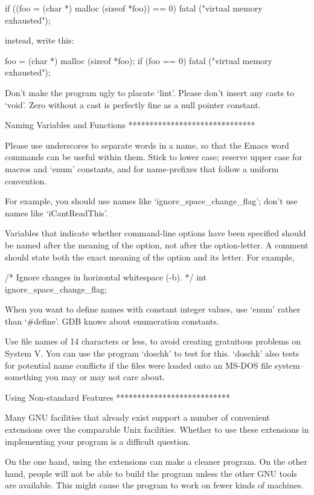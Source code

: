      if ((foo = (char *) malloc (sizeof *foo)) == 0)
       fatal ("virtual memory exhausted");

instead, write this:

     foo = (char *) malloc (sizeof *foo);
     if (foo == 0)
       fatal ("virtual memory exhausted");

   Don't make the program ugly to placate `lint'.  Please don't insert
any casts to `void'.  Zero without a cast is perfectly fine as a null
pointer constant.

Naming Variables and Functions
******************************

   Please use underscores to separate words in a name, so that the Emacs
word commands can be useful within them.  Stick to lower case; reserve
upper case for macros and `enum' constants, and for name-prefixes that
follow a uniform convention.

   For example, you should use names like `ignore_space_change_flag';
don't use names like `iCantReadThis'.

   Variables that indicate whether command-line options have been
specified should be named after the meaning of the option, not after
the option-letter.  A comment should state both the exact meaning of
the option and its letter.  For example,

     /* Ignore changes in horizontal whitespace (-b).  */
     int ignore_space_change_flag;

   When you want to define names with constant integer values, use
`enum' rather than `#define'.  GDB knows about enumeration constants.

   Use file names of 14 characters or less, to avoid creating gratuitous
problems on System V.  You can use the program `doschk' to test for
this.  `doschk' also tests for potential name conflicts if the files
were loaded onto an MS-DOS file system--something you may or may not
care about.

Using Non-standard Features
***************************

   Many GNU facilities that already exist support a number of convenient
extensions over the comparable Unix facilities.  Whether to use these
extensions in implementing your program is a difficult question.

   On the one hand, using the extensions can make a cleaner program.
On the other hand, people will not be able to build the program unless
the other GNU tools are available.  This might cause the program to
work on fewer kinds of machines.

